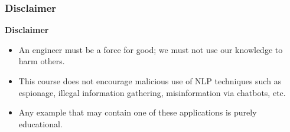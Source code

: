 \documentclass{beamer}
\begin{document}
\begin{frame}
	\frametitle{Disclaimer}
	
	\begin{tcolorbox}[colback=red,
		colframe=red,  
		arc=0pt,outer arc=0pt,
		valign=top, 
		halign=center,
		width=\textwidth]
		
		\color{white}
		{\bfseries Disclaimer}
		
	\end{tcolorbox}\vspace{-.5cm}
	\begin{tcolorbox}[colback=my-grey,
		colframe=my-grey,  
		center, arc=0pt,outer arc=0pt,
		valign=top, 
		halign=left,
		width=\textwidth]
		
		\begin{itemize}
			\item An engineer must be a force for good; we must not use our knowledge to harm others.
			\item This course does not encourage malicious use of NLP techniques such as espionage, illegal information gathering, misinformation via chatbots, etc.
			\item Any example that may contain one of these applications is purely educational.	
		\end{itemize}
		
	\end{tcolorbox}
	
\end{frame}
\end{document}
